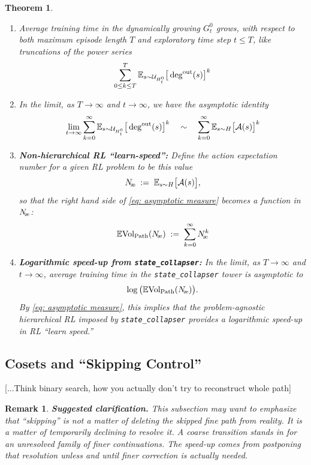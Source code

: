\documentclass[11pt]{article}
\newtheorem{remark}{Remark}[subsection]
\newtheorem{theorem}{Theorem}
\begin{document}
\begin{theorem}
\begin{enumerate}
\item
Average training time in the dynamically growing $G^{0}_{t}$ grows, with respect to both {\em maximum episode length} $T$ and {\em exploratory time step} $t\le T$, like truncations of the power series
$$
\sum^{T}_{0\le k \le T}\mathbb{E}_{s\sim\mathcal{U}_{H^{0}_{t}}}\big[\deg^{\text{{\normalfont out}}}(s)\big]^{k}
$$
\item
In the limit, as $T\to\infty$ and $t\to\infty$, we have the asymptotic identity
\begin{equation}\label{eq: asymptotic measure}
\underset{t\to\infty}{\operatorname{lim}}\sum^{\infty}_{k=0}\mathbb{E}_{s\sim\mathcal{U}_{H^{0}_{t}}}\big[\deg^{\text{{\normalfont out}}}(s)\big]^{k}
\quad\sim\quad
\sum^{\infty}_{k=0}\mathbb{E}_{s\sim H}\big[\mathcal{A}(s)\big]^{k}
\end{equation}
\item
{\bf Non-hierarchical RL ``learn-speed'':}
Define the {\em action expectation number} for a given RL problem to be this value
$$
N_\text{\!{\normalfont \ae}}\;:=\;\mathbb{E}_{s\sim H}\big[\mathcal{A}(s)\big],
$$
so that the right hand side of \eqref{eq: asymptotic measure} becomes a function in $N_\text{\!{\normalfont \ae}}$:
$$
\mathbb{E}\text{{\normalfont Vol}}_\text{{\normalfont Path}}(N_\text{\!{\normalfont \ae}})
\;:=\;\sum_{k=0}^{\infty}N_\text{\!{\normalfont \ae}}^{k}
$$
\item
{\bf Logarithmic speed-up from {\bf\texttt{state\_collapser}}:}
In the limit, as $T\to\infty$ and $t\to\infty$, average training time in the {\normalfont \texttt{state\_collapser}} tower is asymptotic to
$$
\log\big(\mathbb{E}\text{{\normalfont Vol}}_\text{{\normalfont Path}}(N_\text{\!{\normalfont \ae}})\big).
$$
By \eqref{eq: asymptotic measure}, this implies that the problem-agnostic hierarchical RL imposed by {\normalfont \texttt{state\_collapser}} provides a logarithmic speed-up in RL ``learn speed.''
\end{enumerate}
\end{theorem}

\subsection{Cosets and ``Skipping Control''}

[...Think binary search, how you actually don't try to reconstruct whole path]

{\color{blue}
\begin{remark}
{\bf Suggested clarification.}
\normalfont
This subsection may want to emphasize that ``skipping'' is not a matter of deleting the skipped fine path from reality. It is a matter of temporarily declining to resolve it. A coarse transition stands in for an unresolved family of finer continuations. The speed-up comes from postponing that resolution unless and until finer correction is actually needed.
\end{remark}
}
\end{document}

